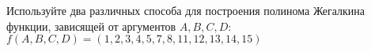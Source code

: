 \question Используйте два различных способа для построения полинома Жегалкина функции, зависящей от аргументов $A, B, C, D$:
$f(A,B,C,D) = (1,2,3,4,5,7,8,11,12,13,14,15)$